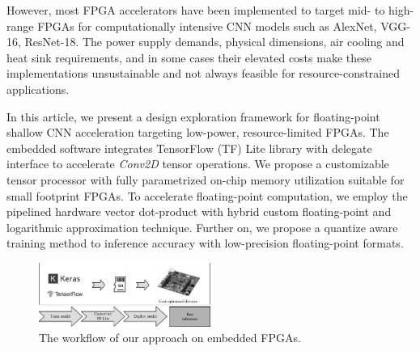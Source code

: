 However, most FPGA accelerators have been implemented to target mid- to high-range FPGAs for computationally intensive CNN models such as AlexNet, VGG-16, ResNet-18. The power supply demands, physical dimensions, air cooling and heat sink requirements, and in some cases their elevated costs make these implementations unsustainable and not always feasible for resource-constrained applications.


In this article, we present a design exploration framework for floating-point shallow CNN acceleration targeting low-power, resource-limited FPGAs. The embedded software integrates TensorFlow (TF) Lite library with delegate interface to accelerate \emph{Conv2D} tensor operations. We propose a customizable tensor processor with fully parametrized on-chip memory utilization suitable for small footprint FPGAs. To accelerate floating-point computation, we employ the pipelined hardware vector dot-product with hybrid custom floating-point and logarithmic approximation technique\cite{nevarez2021accelerating}. Further on, we propose a quantize aware training method to  inference accuracy with low-precision floating-point formats.

\begin{figure}[t!]
	\centering
	\includegraphics[width=0.5\textwidth]{../figures/workflow.pdf}
	\caption{The workflow of our approach on embedded FPGAs.}
	\label{fig:workflow}
\end{figure}

